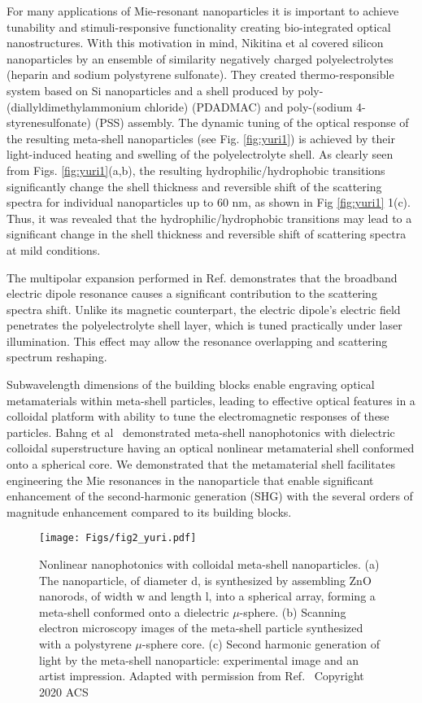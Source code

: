 \documentclass[journal=chreay,manuscript=review]{achemso}
\begin{document}
For many applications of Mie-resonant nanoparticles it is important to achieve tunability and stimuli-responsive functionality creating bio-integrated optical nanostructures. With this motivation in mind, Nikitina et al\cite{nikitina2021all} covered silicon nanoparticles by an ensemble of similarity negatively charged polyelectrolytes (heparin and sodium polystyrene sulfonate).  They created thermo-responsible system based on Si nanoparticles and a shell produced by poly-(diallyldimethylammonium chloride) (PDADMAC) and poly-(sodium 4-styrenesulfonate) (PSS) assembly. The dynamic tuning of the optical response of the resulting meta-shell nanoparticles (see Fig. \ref{fig:yuri1}) is achieved by their light-induced heating and swelling of the polyelectrolyte shell. As clearly seen from Figs. \ref{fig:yuri1}(a,b), the resulting hydrophilic/hydrophobic transitions significantly change the shell thickness and reversible shift of the scattering spectra for individual nanoparticles up to 60 nm, as shown in Fig \ref{fig:yuri1} 1(c).  Thus, it was revealed that the hydrophilic/hydrophobic transitions may lead to a significant change in the shell thickness and reversible shift of scattering spectra at mild conditions.

The multipolar expansion performed in Ref. demonstrates that the broadband electric dipole resonance causes a significant contribution to the scattering spectra shift. Unlike its magnetic
counterpart, the electric dipole’s electric field penetrates the polyelectrolyte shell layer, which is tuned practically under laser illumination. This effect may allow the resonance overlapping and scattering spectrum reshaping.

Subwavelength dimensions of the building blocks enable engraving optical metamaterials within meta-shell particles,  leading to effective optical features in a colloidal platform with ability to tune the electromagnetic responses of these particles.  Bahng et al~\cite{bahng2020mie} demonstrated meta-shell nanophotonics with dielectric colloidal superstructure having an optical nonlinear metamaterial shell conformed onto a spherical core. We demonstrated that the metamaterial shell facilitates engineering the Mie resonances in the nanoparticle that enable significant enhancement of the second-harmonic generation (SHG) with the several orders of magnitude enhancement compared to its building blocks. 

\begin{figure}[h]
    \centering
    \texttt{[image: Figs/fig2\_yuri.pdf]}
    \caption{Nonlinear nanophotonics with colloidal meta-shell nanoparticles. (a) The nanoparticle, of diameter d, is synthesized by assembling ZnO nanorods, of width w and length l, into a spherical array, forming a meta-shell conformed onto a dielectric $\mu$-sphere. (b) Scanning electron microscopy images of the meta-shell particle synthesized with a polystyrene $\mu$-sphere core. (c) Second harmonic generation of light by the meta-shell nanoparticle: experimental image and an artist impression. Adapted with permission from Ref.~ Copyright 2020 ACS}
    \label{fig:yuri2}
\end{figure}
\end{document}
